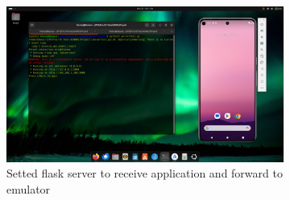 \documentclass[a4paper,12pt]{article}
\begin{document}
\begin{figure}[h]
    \centering
    \begin{subfigure}[b]{0.75\textwidth}
        \includegraphics[width=\textwidth]{../images/python-sms-server.png}
        \caption{Setted flask server to receive application and forward to emulator}
    \end{subfigure}
    \hfill
    \begin{subfigure}[b]{0.2\textwidth}

\end{subfigure}
\end{figure}
\end{document}
